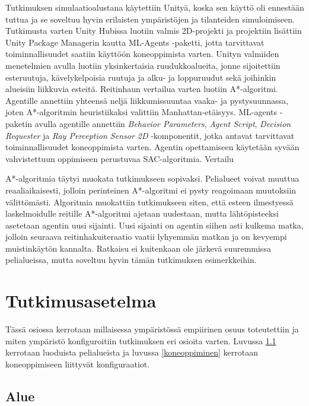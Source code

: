 \documentclass[utf8]{gradu3}
\begin{document}
Tutkimuksen simulaatioalustana käytettiin Unityä, koska sen käyttö oli ennestään tuttua ja se soveltuu hyvin erilaisten ympäristöjen ja tilanteiden simuloimiseen. Tutkimusta varten Unity Hubissa luotiin valmis 2D-projekti ja projektiin lisättiin Unity Package Managerin kautta ML-Agents -paketti, jotta tarvittavat toiminnallisuudet saatiin käyttöön koneoppimista varten. Unityn valmiiden menetelmien avulla luotiin yksinkertaisia ruudukkoalueita, jonne sijoitettiin esteruutuja, kävelykelpoisia ruutuja ja alku- ja loppuruudut sekä joihinkin alueisiin liikkuvia esteitä. Reitinhaun vertailua varten luotiin A*-algoritmi. Agentille annettiin yhteensä neljä liikkumissuuntaa vaaka- ja pystysuunnassa, joten A*-algoritmin heuristiikaksi valittiin Manhattan-etäisyys. ML-agents -paketin avulla agentille annettiin \textit{Behavior Parameters}, \textit{Agent Script}, \textit{Decision Requester} ja \textit{Ray Perception Sensor 2D} -komponentit, jotka antavat tarvittavat toiminnallisuudet koneoppimista varten. Agentin opettamiseen käytetään syvään vahvistettuun oppimiseen perustuvaa SAC-algoritmia. Vertailu 

A*-algoritmia täytyi muokata tutkimukseen sopivaksi. Pelialueet voivat muuttua reaaliaikaisesti, jolloin perinteinen A*-algoritmi ei pysty reagoimaan muutoksiin välittömästi. Algoritmia muokattiin tutkimukseen siten, että esteen ilmestyessä laskelmoidulle reitille A*-algoritmi ajetaan uudestaan, mutta lähtöpisteeksi asetetaan agentin uusi sijainti. Uusi sijainti on agentin siihen asti kulkema matka, jolloin seuraava reitinhakuiteraatio vaatii lyhyemmän matkan ja on kevyempi muistinkäytön kannalta. Ratkaisu ei kuitenkaan ole järkevä suuremmissa pelialueissa, mutta soveltuu hyvin tämän tutkimuksen esimerkkeihin.

\section{Tutkimusasetelma}
\label{sec:tutkimusasetelma}

Tässä osiossa kerrotaan millaisessa ympäristössä empiirinen osuus toteutettiin ja miten ympäristö konfiguroitiin tutkimuksen eri osioita varten. Luvussa \ref{alue} kerrotaan luoduista pelialueista ja luvussa \ref{koneoppiminen} kerrotaan koneoppimiseen liittyvät konfiguraatiot.

\subsection{Alue}
\label{alue}
\end{document}

